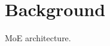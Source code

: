 \section{Background}\label{sec:background}
MoE architecture.\cite{DBLP:journals/corr/abs-2101-03961}